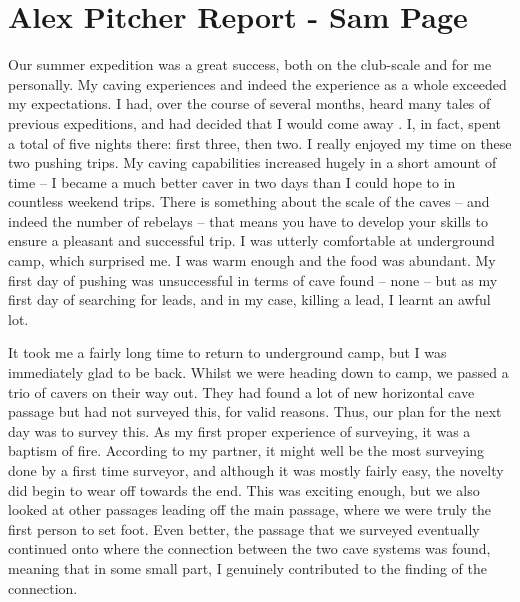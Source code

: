 \section{Alex Pitcher Report - Sam Page}


Our summer expedition was a great success, both on the club-scale and for me personally. My caving experiences and indeed the experience as a whole exceeded my expectations. I had, over the course of several months, heard many tales of previous expeditions, and had decided that I would come away . I, in fact, spent a total of five nights there: first three, then two. I really enjoyed my time on these two pushing trips. My caving capabilities increased hugely in a short amount of time – I became a much better caver in two days than I could hope to in countless weekend trips. There is something about the scale of the caves – and indeed the number of rebelays – that means you have to develop your skills to ensure a pleasant and successful trip. I was utterly comfortable at underground camp, which surprised me. I was warm enough and the food was abundant. My first day of pushing was unsuccessful in terms of cave found – none – but as my first day of searching for leads, and in my case, killing a lead, I learnt an awful lot.



It took me a fairly long time to return to underground camp, but I was immediately glad to be back. Whilst we were heading down to camp, we passed a trio of cavers on their way out. They had found a lot of new horizontal cave passage but had not surveyed this, for valid reasons. Thus, our plan for the next day was to survey this. As my first proper experience of surveying, it was a baptism of fire. According to my partner, it might well be the most surveying done by a first time surveyor, and although it was mostly fairly easy, the novelty did begin to wear off towards the end. This was exciting enough, but we also looked at other passages leading off the main passage, where we were truly the first person to set foot. Even better, the passage that we surveyed eventually continued onto where the connection between the two cave systems was found, meaning that in some small part, I genuinely contributed to the finding of the connection.

